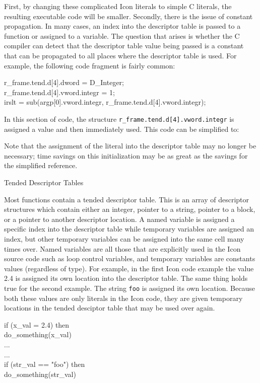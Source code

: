 First, by changing these complicated Icon literals to simple C
literals, the resulting executable code will be smaller. Secondly,
there is the issue of constant propagation. In many cases, an index
into the descriptor table is passed to a function or assigned to a
variable. The question that arises is whether the C compiler can
detect that the descriptor table value being passed is a constant that
can be propagated to all places where the descriptor table is used.
For example, the following code fragment is fairly common:

\begin{iconcode}
r\_frame.tend.d[4].dword = D\_Integer;\\
r\_frame.tend.d[4].vword.integr = 1;\\
irslt = sub(argp[0].vword.integr, r\_frame.tend.d[4].vword.integr);
\end{iconcode}

In this section of code, the structure
\texttt{r\_frame.tend.d[4].vword.integr} is assigned a value and then
immediately used. This code can be simplified to:



Note that the assignment of the literal into the descriptor table may
no longer be necessary; time savings on this initialization may be as
great as the savings for the simplified reference.

{\sffamily
Tended Descriptor Tables}


Most functions contain a tended descriptor table. This is an array of
descriptor structures which contain either an integer, pointer to a
string, pointer to a block, or a pointer to another descriptor
location. A named variable is assigned a specific index into the
descriptor table while temporary variables are assigned an index, but
other temporary variables can be assigned into the same cell many
times over. Named variables are all those that are explicitly used in
the Icon source code such as loop control variables, and temporary
variables are constants values (regardless of type). For example, in
the first Icon code example the value 2.4 is assigned its own location
into the descriptor table. The same thing holds true for the second
example. The string \texttt{{\textquotedbl}foo{\textquotedbl}} is
assigned its own location. Because both these values are only literals
in the Icon code, they are given temporary locations in the tended
desciptor table that may be used over again.

\begin{iconcode}
\>   if (x\_val = 2.4) then \\
\> \>   do\_something(x\_val) \\
\>   ... \\
\>   ... \\
\>   if (str\_val == "foo") then \\
\> \>   do\_something(str\_val)
\end{iconcode}


